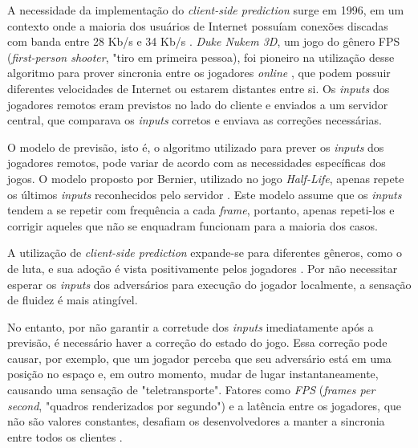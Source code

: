 A necessidade da implementação do \textit{client-side prediction} surge em 1996, em um contexto onde a maioria dos usuários de Internet possuíam conexões discadas com banda entre 28 Kb/s e 34 Kb/s \cite{broadband}. \textit{Duke Nukem 3D}, um jogo do gênero FPS (\textit{first-person shooter}, "tiro em primeira pessoa), foi pioneiro na utilização desse algoritmo para prover sincronia entre os jogadores \textit{online} \cite{duke_nukem}, que podem possuir diferentes velocidades de Internet ou estarem distantes entre si. Os \textit{inputs} dos jogadores remotos eram previstos no lado do cliente e enviados a um servidor central, que comparava os \textit{inputs} corretos e enviava as correções necessárias.

O modelo de previsão, isto é, o algoritmo utilizado para prever os \textit{inputs} dos jogadores remotos, pode variar de acordo com as necessidades específicas dos jogos. O modelo proposto por Bernier, utilizado no jogo \textit{Half-Life}, apenas repete os últimos \textit{inputs} reconhecidos pelo servidor \cite{client-side-prediction}. Este modelo assume que os \textit{inputs} tendem a se repetir com frequência a cada \textit{frame}, portanto, apenas repeti-los e corrigir aqueles que não se enquadram funcionam para a maioria dos casos.

A utilização de \textit{client-side prediction} expande-se para diferentes gêneros, como o de luta, e sua adoção é vista positivamente pelos jogadores \cite{rollback_success}. Por não necessitar esperar os \textit{inputs} dos adversários para execução do jogador localmente, a sensação de fluidez é mais atingível.

No entanto, por não garantir a corretude dos \textit{inputs} imediatamente após a previsão, é necessário haver a correção do estado do jogo. Essa correção pode causar, por exemplo, que um jogador perceba que seu adversário está em uma posição no espaço e, em outro momento, mudar de lugar instantaneamente, causando uma sensação de "teletransporte". Fatores como \textit{FPS} (\textit{frames per second}, "quadros renderizados por segundo") e a latência entre os jogadores, que não são valores constantes, desafiam os desenvolvedores a manter a sincronia entre todos os clientes \cite{client-side-prediction}.